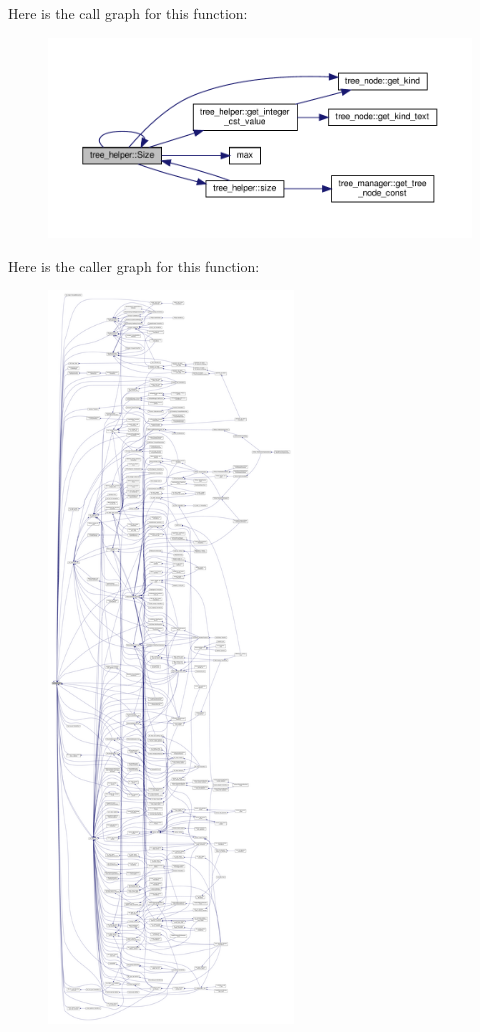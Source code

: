 Here is the call graph for this function\+:
\nopagebreak
\begin{figure}[H]
\begin{center}
\leavevmode
\includegraphics[width=350pt]{d7/d99/classtree__helper_a3bc8327685050e3716f167a51daddc3f_cgraph}
\end{center}
\end{figure}
Here is the caller graph for this function\+:
\nopagebreak
\begin{figure}[H]
\begin{center}
\leavevmode
\includegraphics[height=550pt]{d7/d99/classtree__helper_a3bc8327685050e3716f167a51daddc3f_icgraph}
\end{center}
\end{figure}


